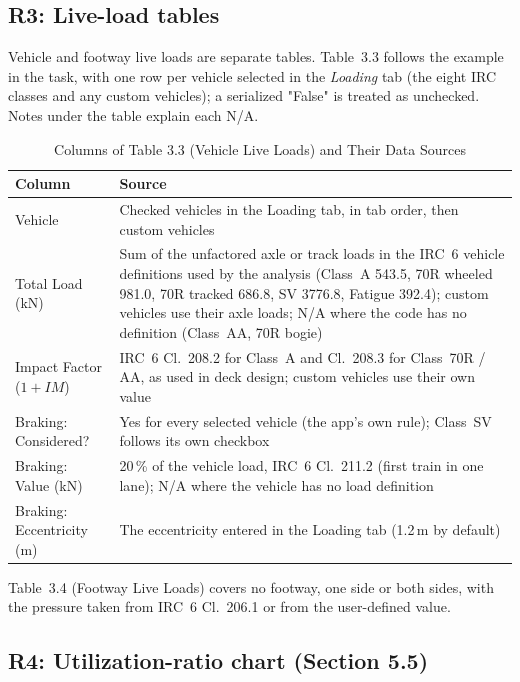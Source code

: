 \documentclass[11pt,a4paper]{article}
\newcommand{\thead}{\rowcolor{headbg}}
\newcommand{\hd}[1]{\sffamily\bfseries\color{ink}#1}
\newcommand{\breakus}{\textunderscore\allowbreak}
\newcommand{\code}[1]{{\ttfamily\let\_\breakus #1}}
\begin{document}
\subsection{R3: Live-load tables}\label{sec:r3}

Vehicle and footway live loads are separate tables. Table~3.3 follows the example in the task, with one row per vehicle
selected in the \emph{Loading} tab (the eight IRC classes and any custom vehicles); a serialized \code{"False"} is
treated as unchecked. Notes under the table explain each N/A.

\begin{table}[!htbp]
\caption{Columns of Table 3.3 (Vehicle Live Loads) and Their Data Sources}
\small
\begin{tabularx}{\linewidth}{@{}L{3.3cm} Y@{}}
\toprule
\thead \hd{Column} & \hd{Source} \\
\midrule
Vehicle               & Checked vehicles in the Loading tab, in tab order, then custom vehicles \\
Total Load (kN)       & Sum of the unfactored axle or track loads in the IRC~6 vehicle definitions used by the analysis
                        (Class~A 543.5, 70R wheeled 981.0, 70R tracked 686.8, SV 3776.8, Fatigue 392.4); custom vehicles
                        use their axle loads; N/A where the code has no definition (Class~AA, 70R bogie) \\
Impact Factor ($1+\mathit{IM}$) & IRC~6 Cl.~208.2 for Class~A and Cl.~208.3 for Class~70R / AA, as used in deck design;
                        custom vehicles use their own value \\
Braking: Considered?  & Yes for every selected vehicle (the app's own rule); Class~SV follows its own checkbox \\
Braking: Value (kN)   & 20\,\% of the vehicle load, IRC~6 Cl.~211.2 (first train in one lane); N/A where the vehicle has no load definition \\
Braking: Eccentricity (m) & The eccentricity entered in the Loading tab (1.2\,m by default) \\
\bottomrule
\end{tabularx}
\end{table}

Table~3.4 (Footway Live Loads) covers no footway, one side or both sides, with the pressure taken from IRC~6
Cl.~206.1 or from the user-defined value.

\subsection{R4: Utilization-ratio chart (Section 5.5)}\label{sec:r4}
\end{document}
